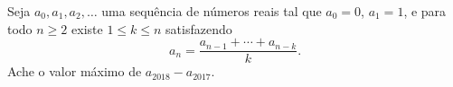 Seja $a_0, a_1, a_2, \dots$ uma sequência de números reais tal que $a_0 = 0$, $a_1 = 1$, e para todo $n \ge 2$ existe $1 \le k \le n$ satisfazendo
\[a_n = \dfrac{a_{n-1} + \cdots + a_{n-k}}{k}.\]
Ache o valor máximo de $a_{2018} - a_{2017}$.

